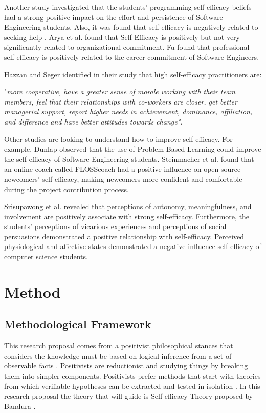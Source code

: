 \documentclass[10pt, conference]{IEEEtran}
\begin{document}
Another study investigated that the students' programming self-efficacy beliefs had a strong positive impact on the effort and persistence of Software Engineering students. Also, it was found that self-efficacy is negatively related to seeking help \cite{kanaparan2017self}. Arya et al.\cite{arya2012moderating} found that Self Efficacy is positively but not very significantly related to organizational commitment. Fu \cite{fu2010information} found that professional self-efficacy is positively related to the career commitment of Software Engineers. 

Hazzan and Seger \cite{hazzan2010recruiting} identified in their study that high self-efficacy practitioners are:

"\textit{more cooperative, have a greater sense of morale working with their team members, feel that their relationships with co-workers are closer, get better managerial support, report higher needs in achievement, dominance, affiliation, and difference and have better attitudes towards change"}. 


Other studies are looking to understand how to improve self-efficacy. For example, Dunlap \cite{dunlap2005problem} observed that the use of Problem-Based Learning could improve the self-efficacy of Software Engineering students. Steinmacher et al. \cite{steinmacher2015increasing} found that an online coach called FLOSScoach had a positive influence on open source newcomers' self-efficacy, making newcomers more confident and comfortable during the project contribution process.

Srisupawong et al. \cite{srisupawong2018relationship} revealed that perceptions of autonomy, meaningfulness, and involvement are positively associate with strong self-efficacy. Furthermore, the students' perceptions of vicarious experiences and perceptions of social persuasions demonstrated a positive relationship with self-efficacy. Perceived physiological and affective states demonstrated a negative influence self-efficacy of computer science students.
 
\section{Method}

\subsection{Methodological Framework} 

This research proposal comes from a positivist philosophical stances that considers the knowledge must be based on logical inference from a set of observable facts \cite{easterbrook2008selecting}. Positivists are reductionist and studying things by breaking them into simpler components. Positivists prefer methods that start with theories from which verifiable hypotheses can be extracted and tested in isolation \cite{easterbrook2008selecting}. In this research proposal the theory that will guide is Self-efficacy Theory  proposed by Bandura \cite{bandura1977self}.
\end{document}
